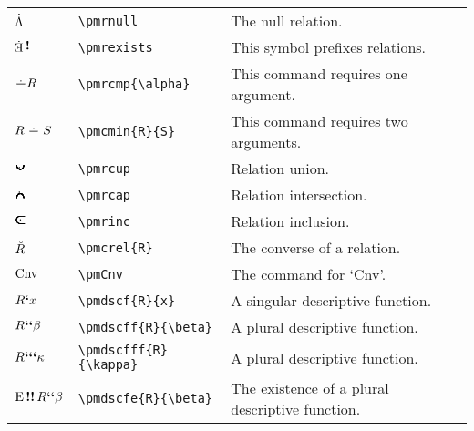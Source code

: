 \documentclass[12pt]{article}
\begin{document}
\begin{tabular}{@{}p{3cm} | p{5cm} | p{8.25cm}}
	$\dot{\Lambda}$ & \verb|\pmrnull| & The null relation. \\
	$\pmrexists$ & \verb|\pmrexists| & This symbol prefixes relations. \\
	$\pmrcmp{R}$ & \verb|\pmrcmp{\alpha}| & This command requires one argument. \\
	$\pmrmin{R}{S}$ & \verb|\pmcmin{R}{S}| & This command requires two arguments. \\
	$\pmrcup$ & \verb|\pmrcup| & Relation union. \\
	$\pmrcap$ & \verb|\pmrcap| & Relation intersection. \\
	$\pmrinc$ & \verb|\pmrinc| & Relation inclusion. \\
	$\breve{R}$ & \verb|\pmcrel{R}| & The converse of a relation. \\
	$\text{Cnv}$ & \verb|\pmCnv| & The command for `Cnv'. \\
	$R\textbf{`}x$ & \verb|\pmdscf{R}{x}| & A singular descriptive function. \\
	$R\textbf{`}\textbf{`}\beta$ & \verb|\pmdscff{R}{\beta}| & A plural descriptive function. \\
	$R\textbf{`}\textbf{`}\textbf{`}\kappa$ & \verb|\pmdscfff{R}{\kappa}| & A plural descriptive function.   \\
	$\mathop{\text{E}}\mathop{\textbf{!}\textbf{!}}R\textbf{`}\textbf{`}\beta$ & \verb|\pmdscfe{R}{\beta}| & The existence of a plural descriptive function.
\end{tabular}
\end{document}
